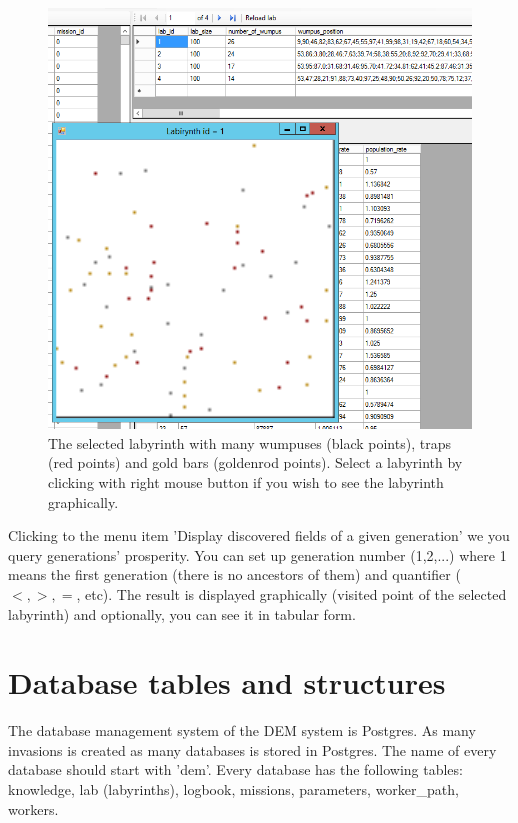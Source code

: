 \documentclass[a4paper,12pt]{article}
\begin{document}
\begin{figure}
	\begin{center}
		\includegraphics[width=15cm]{labrightclick.png}
		\caption{The selected labyrinth with many wumpuses (black points), traps (red points) and gold bars (goldenrod points). Select a labyrinth by clicking with right mouse button if you wish to see the labyrinth graphically.}
		\label{fig:labrightclick}
	\end{center}
\end{figure}

Clicking to the menu item  'Display discovered fields of a given generation' we you query generations' prosperity. You can set up generation number (1,2,...) where 1 means the first generation (there is no ancestors of them) and quantifier ($<,>,=$, etc). The result is displayed graphically (visited point of the selected labyrinth) and optionally, you can see it in tabular form.

\section{Database tables and structures}

The database management system of the DEM system is Postgres. As many invasions is created as many databases is stored in Postgres. The name of every database should start with 'dem'. Every database has the following tables: knowledge, lab (labyrinths), logbook, missions, parameters, worker\_path, workers.
\end{document}
